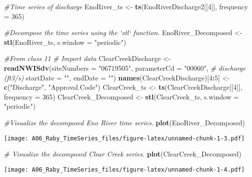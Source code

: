 \documentclass[]{article}
\newenvironment{Shaded}{\begin{snugshade}}{\end{snugshade}}
\newcommand{\CommentTok}[1]{\textcolor[rgb]{0.56,0.35,0.01}{\textit{#1}}}
\newcommand{\DataTypeTok}[1]{\textcolor[rgb]{0.13,0.29,0.53}{#1}}
\newcommand{\DecValTok}[1]{\textcolor[rgb]{0.00,0.00,0.81}{#1}}
\newcommand{\KeywordTok}[1]{\textcolor[rgb]{0.13,0.29,0.53}{\textbf{#1}}}
\newcommand{\NormalTok}[1]{#1}
\newcommand{\OperatorTok}[1]{\textcolor[rgb]{0.81,0.36,0.00}{\textbf{#1}}}
\newcommand{\StringTok}[1]{\textcolor[rgb]{0.31,0.60,0.02}{#1}}
\begin{document}
\begin{Shaded}
\begin{Highlighting}[]
\CommentTok{#Time series of discharge}
\NormalTok{EnoRiver_ts <-}\StringTok{ }\KeywordTok{ts}\NormalTok{(EnoRiverDischarge2[[}\DecValTok{4}\NormalTok{]], }\DataTypeTok{frequency =} \DecValTok{365}\NormalTok{)}

\CommentTok{#Decompose the time series using the `stl` function.}
\NormalTok{EnoRiver_Decomposed <-}\StringTok{ }\KeywordTok{stl}\NormalTok{(EnoRiver_ts, }\DataTypeTok{s.window =} \StringTok{"periodic"}\NormalTok{)}



\CommentTok{#From class 11}
\CommentTok{# Import data}
\NormalTok{ClearCreekDischarge <-}\StringTok{ }\KeywordTok{readNWISdv}\NormalTok{(}\DataTypeTok{siteNumbers =} \StringTok{"06719505"}\NormalTok{,}
                     \DataTypeTok{parameterCd =} \StringTok{"00060"}\NormalTok{, }\CommentTok{# discharge (ft3/s)}
                     \DataTypeTok{startDate =} \StringTok{""}\NormalTok{,}
                     \DataTypeTok{endDate =} \StringTok{""}\NormalTok{)}
\KeywordTok{names}\NormalTok{(ClearCreekDischarge)[}\DecValTok{4}\OperatorTok{:}\DecValTok{5}\NormalTok{] <-}\StringTok{ }\KeywordTok{c}\NormalTok{(}\StringTok{"Discharge"}\NormalTok{, }\StringTok{"Approval.Code"}\NormalTok{)}
\NormalTok{ClearCreek_ts <-}\StringTok{ }\KeywordTok{ts}\NormalTok{(ClearCreekDischarge[[}\DecValTok{4}\NormalTok{]], }\DataTypeTok{frequency =} \DecValTok{365}\NormalTok{)}
\NormalTok{ClearCreek_Decomposed <-}\StringTok{ }\KeywordTok{stl}\NormalTok{(ClearCreek_ts, }\DataTypeTok{s.window =} \StringTok{"periodic"}\NormalTok{)}


\CommentTok{#Visualize the decomposed Eno River time series.}
\KeywordTok{plot}\NormalTok{(EnoRiver_Decomposed)}
\end{Highlighting}
\end{Shaded}

\texttt{[image: A06\_Raby\_TimeSeries\_files/figure-latex/unnamed-chunk-1-3.pdf]}

\begin{Shaded}
\begin{Highlighting}[]
\CommentTok{# Visualize the decomposed Clear Creek series. }
\KeywordTok{plot}\NormalTok{(ClearCreek_Decomposed)}
\end{Highlighting}
\end{Shaded}

\texttt{[image: A06\_Raby\_TimeSeries\_files/figure-latex/unnamed-chunk-1-4.pdf]}
\end{document}
